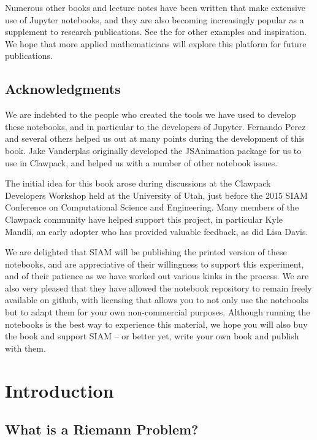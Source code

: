 \documentclass{SIAMbook2016}
\begin{document}
Numerous other books and lecture notes have been written that make
extensive use of Jupyter notebooks, and they are also becoming
increasingly popular as a supplement to research publications. See the
 for other examples and inspiration. We
hope that more applied mathematicians will explore this platform for
future publications.

\hypertarget{acknowledgments}{%
\section{Acknowledgments}\label{acknowledgments}}

We are indebted to the people who created the tools we have used to
develop these notebooks, and in particular to the developers of Jupyter.
Fernando Perez and several others helped us out at many points during
the development of this book. Jake Vanderplas originally developed the
JSAnimation package for us to use in Clawpack, and helped us with a
number of other notebook issues.

The initial idea for this book arose during discussions at the Clawpack
Developers Workshop held at the University of Utah, just before the 2015
SIAM Conference on Computational Science and Engineering. Many members
of the Clawpack community have helped support this project, in
particular Kyle Mandli, an early adopter who has provided valuable
feedback, as did Lisa Davis.

We are delighted that SIAM will be publishing the printed version of
these notebooks, and are appreciative of their willingness to support
this experiment, and of their patience as we have worked out various
kinks in the process. We are also very pleased that they have allowed
the notebook repository to remain freely available on github, with
licensing that allows you to not only use the notebooks but to adapt
them for your own non-commercial purposes. Although running the
notebooks is the best way to experience this material, we hope you will
also buy the book and support SIAM -- or better yet, write your own book
and publish with them.

\hypertarget{introduction}{%
\chapter{Introduction}\label{introduction}}
\label{sec:01-Introduction}
\hypertarget{what-is-a-riemann-problem}{%
\section{What is a Riemann Problem?}\label{what-is-a-riemann-problem}}
\end{document}
